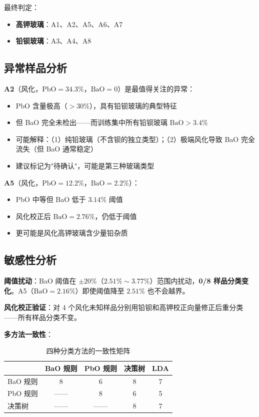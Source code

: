 最终判定：
\begin{itemize}
    \item \textbf{高钾玻璃}：A1、A2、A5、A6、A7
    \item \textbf{铅钡玻璃}：A3、A4、A8
\end{itemize}

\subsection{异常样品分析}

\textbf{A2}（风化，$\text{PbO} = 34.3\%$，$\text{BaO} = 0$）是最值得关注的异常：
\begin{itemize}
    \item PbO 含量极高（$> 30\%$），具有铅钡玻璃的典型特征
    \item 但 BaO 完全未检出——而训练集中所有铅钡玻璃 $\text{BaO} > 3.4\%$
    \item 可能解释：（1）纯铅玻璃（不含钡的独立类型）；（2）极端风化导致 BaO 完全流失（但 BaO 通常稳定）
    \item 建议标记为"待确认"，可能是第三种玻璃类型
\end{itemize}

\textbf{A5}（风化，$\text{PbO} = 12.2\%$，$\text{BaO} = 2.2\%$）：
\begin{itemize}
    \item PbO 中等但 BaO 低于 $3.14\%$ 阈值
    \item 风化校正后 $\text{BaO} = 2.76\%$，仍低于阈值
    \item 更可能是风化高钾玻璃含少量铅杂质
\end{itemize}

\subsection{敏感性分析}

\textbf{阈值扰动}：BaO 阈值在 $\pm 20\%$（$2.51\%\sim3.77\%$）范围内扰动，\textbf{0/8 样品分类变化}。A5（$\text{BaO} = 2.16\%$）即使阈值降至 $2.51\%$ 也不会越界。

\textbf{风化校正验证}：对 4 个风化未知样品分别用铅钡和高钾校正向量修正后重分类——所有样品分类不变。

\textbf{多方法一致性}：

\begin{table}[H]
    \centering
    \caption{四种分类方法的一致性矩阵}
    \label{tab:consensus}
    \begin{tabular}{l c c c c}
        \toprule
        & \textbf{BaO 规则} & \textbf{PbO 规则} & \textbf{决策树} & \textbf{LDA} \\
        \midrule
        BaO 规则 & 8 & 6 & 8 & 7 \\
        PbO 规则 & —— & 8 & 6 & 5 \\
        决策树 & —— & —— & 8 & 7 \\
        \bottomrule
    \end{tabular}
\end{table}

